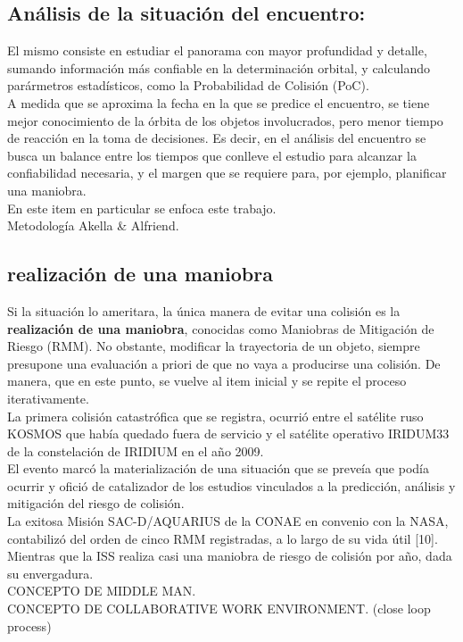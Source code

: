 \subsection*{An\'alisis de la situaci\'on del encuentro: }
El mismo consiste en estudiar el panorama con mayor profundidad y detalle, sumando informaci\'on m\'as confiable en la determinaci\'on orbital, y calculando par\'armetros estad\'isticos, como la Probabilidad de Colisi\'on (PoC).\\
A medida que se aproxima la fecha en la que se predice el encuentro, se tiene mejor conocimiento de la \'orbita de los objetos involucrados, pero menor tiempo de reacci\'on en la toma de decisiones. Es decir, en el an\'alisis del encuentro se busca un balance entre los tiempos que conlleve el estudio para alcanzar la confiabilidad necesaria, y el margen que se requiere para, por ejemplo, planificar una maniobra.\\
En este item en particular se enfoca este trabajo.\\

Metodolog\'ia Akella \& Alfriend.\\

\subsection*{realizaci\'on de una maniobra}
Si la situaci\'on lo ameritara, la \'unica manera de evitar una colisi\'on es la {\bf{realizaci\'on de una maniobra}}, conocidas como Maniobras de Mitigaci\'on de Riesgo (RMM). No obstante, modificar la trayectoria de un objeto, siempre presupone una evaluaci\'on a priori de que no vaya a producirse una colisi\'on. De manera, que en este punto, se vuelve al item inicial y se repite el proceso iterativamente.\\ 



La primera colisi\'on catastr\'ofica que se registra, ocurri\'o entre el sat\'elite ruso KOSMOS  que hab\'ia quedado fuera de servicio y el sat\'elite operativo IRIDUM33 de la constelaci\'on de IRIDIUM en el a\~no 2009.\\
El evento marc\'o la materializaci\'on de una situaci\'on que se preve\'ia que pod\'ia ocurrir y ofici\'o de catalizador de los estudios vinculados a la predicci\'on, an\'alisis y mitigaci\'on del riesgo de colisi\'on.\\
La exitosa Misi\'on SAC-D/AQUARIUS de la CONAE en convenio con la \ac{NASA}, contabiliz\'o del orden de cinco RMM registradas, a lo largo de su vida \'util [10]. Mientras que la \ac{ISS} realiza casi una maniobra de riesgo de colisi\'on por año, dada su envergadura.\\
CONCEPTO DE MIDDLE MAN.\\
CONCEPTO DE COLLABORATIVE WORK ENVIRONMENT. (close loop process)

